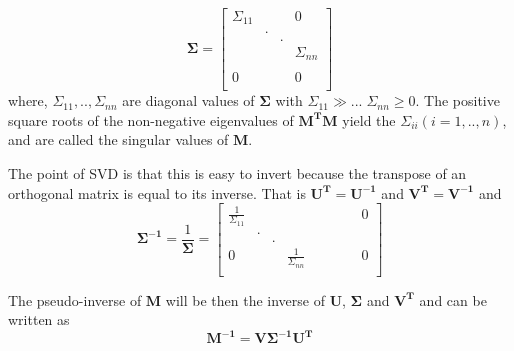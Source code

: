 \begin{equation}
\bm{\Sigma} = \begin{bmatrix} 
\Sigma_{11} &   &   & 0           \\
            & . &   &             \\
            &   & . &             \\
            &   &   & \Sigma_{nn} \\
            &   &   &             \\
          0 &   &   & 0          \\

 \end{bmatrix}
\end{equation}
where, $\Sigma_{11},..,\Sigma_{nn}$ are diagonal values of $\bm{\Sigma}$ with $\Sigma_{11}\gg...\; \Sigma_{nn}\geq0$. The positive square roots of the non-negative eigenvalues of $\bm{M^T}\bm{M}$ yield the $\Sigma_{ii}(i=1,..,n)$, and are called the singular values of $\bm{M}$. 

The point of SVD is that this is easy to invert because the transpose of an orthogonal matrix is equal to its inverse. That is $\bm{U^T}=\bm{U^{-1}}$ and $\bm{V^T}=\bm{V^{-1}}$ and
\begin{equation}\label{eq:sigma_inv}
\bm{\Sigma^{-1}=}\frac{1}{\bm{\Sigma}} = \begin{bmatrix} 
\frac{1}{\Sigma_{11}} &  &  &  &  &  & & &0\\
  & . &  &  & & & & &\\
  &   & . & & & & & &\\

0 &  &  & \frac{1}{\Sigma_{nn}} &  &  & & &0 \\
 \end{bmatrix}
\end{equation}

The pseudo-inverse of $\bm{M}$ will be then the inverse of $\bm{U}$, $\bm{\Sigma}$ and $\bm{V^T}$ and can be written as
\begin{equation}\label{eq:psMinv}
    \bm{M^{-1}} = \bm{V \Sigma^{-1} U^T}
\end{equation}



